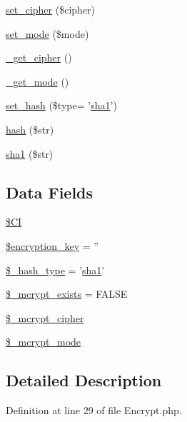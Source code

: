 \begin{DoxyCompactItemize}
\item 
\hyperlink{class_c_i___encrypt_a6459059d757a362410feb13d96455747}{set\-\_\-cipher} (\$cipher)
\item 
\hyperlink{class_c_i___encrypt_ab32fd90a4ac2df4be1e56460d6f6daa3}{set\-\_\-mode} (\$mode)
\item 
\hyperlink{class_c_i___encrypt_a663ee049f0b7596a0e4925a3eb2db062}{\-\_\-get\-\_\-cipher} ()
\item 
\hyperlink{class_c_i___encrypt_a8c6526d9458754249ee7268ead883a6c}{\-\_\-get\-\_\-mode} ()
\item 
\hyperlink{class_c_i___encrypt_ab14b774f9fd0cc2fd082a2c44c5f9f07}{set\-\_\-hash} (\$type= '\hyperlink{class_c_i___encrypt_a0cd7cd589a363e34549991c27584b489}{sha1}')
\item 
\hyperlink{class_c_i___encrypt_aea8db0058c00fd2bc1351ddb2ebf3191}{hash} (\$str)
\item 
\hyperlink{class_c_i___encrypt_a0cd7cd589a363e34549991c27584b489}{sha1} (\$str)
\end{DoxyCompactItemize}
\subsection*{Data Fields}
\begin{DoxyCompactItemize}
\item 
\hyperlink{class_c_i___encrypt_ae0314d046ddf7fcfaec03222977427d3}{\$\-C\-I}
\item 
\hyperlink{class_c_i___encrypt_a35bbf76a5bcca90ca9b39368ed28121c}{\$encryption\-\_\-key} = ''
\item 
\hyperlink{class_c_i___encrypt_a04e9d4ea0e45fc04c07aa1e291e17412}{\$\-\_\-hash\-\_\-type} = '\hyperlink{class_c_i___encrypt_a0cd7cd589a363e34549991c27584b489}{sha1}'
\item 
\hyperlink{class_c_i___encrypt_aaf4246798dad057cc4e294706e5e4e37}{\$\-\_\-mcrypt\-\_\-exists} = F\-A\-L\-S\-E
\item 
\hyperlink{class_c_i___encrypt_ab2cdedd99c4818b191c667f5e081a2db}{\$\-\_\-mcrypt\-\_\-cipher}
\item 
\hyperlink{class_c_i___encrypt_ace4d98b5320c7fe75e6a38505abcdb82}{\$\-\_\-mcrypt\-\_\-mode}
\end{DoxyCompactItemize}


\subsection{Detailed Description}


Definition at line 29 of file Encrypt.\-php.



